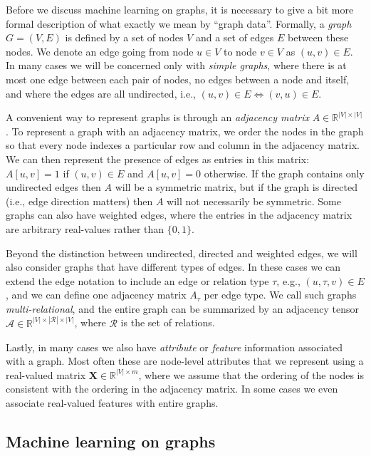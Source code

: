 \documentclass[10pt]{book}
\let\defaultmarginpar\marginpar
\renewcommand\marginpar[2][]{\defaultmarginpar{\itshape\color{gray}#2}}
\begin{document}
Before we discuss machine learning on graphs, it is necessary to give a bit more formal description of what exactly we mean by ``graph data''. Formally, a \emph{graph}\marginpar{graph} $G = (V, E)$ is defined by a set of nodes $V$ and a set of edges $E$ between these nodes. We denote an edge going from node $u \in V$ to node $v \in V$ as $(u, v) \in E$. In many cases we will be concerned only with \emph{simple graphs}, where there is at most one edge between each pair of nodes, no edges between a node and itself, and where the edges are all undirected, i.e., $(u, v) \in E \Longleftrightarrow  (v, u) \in E$.

A convenient way to represent graphs is through an \emph{adjacency matrix}\marginpar{adjacency matrix} $A \in \mathbb R^{|V| \times |V|}$. To represent a graph with an adjacency matrix, we order the nodes in the graph so that every node indexes a particular row and column in the adjacency matrix. We can then represent the presence of edges as entries in this matrix: $A[u, v] = 1$ if $(u, v) \in E$ and $A[u, v] = 0$ otherwise. If the graph contains only undirected edges then $A$ will be a symmetric matrix, but if the graph is directed (i.e., edge direction matters) then $A$ will not necessarily be symmetric. Some graphs can also have weighted edges, where the entries in the adjacency matrix are arbitrary real-values rather than $\{0, 1\}$.

Beyond the distinction between undirected, directed and weighted edges, we will also consider graphs that have different types of edges. In these cases we can extend the edge notation to include an edge or relation type $\tau$, e.g., $(u, \tau, v) \in E$, and we can define one adjacency matrix $A_\tau$ per edge type. We call such graphs \emph{multi-relational}\marginpar{multi-relational graph}, and the entire graph can be summarized by an adjacency tensor $\mathcal A \in \mathbb R^{|V| \times |\mathcal R| \times |V|}$, where $\mathcal R$ is the set of relations.

Lastly, in many cases we also have \emph{attribute} or \emph{feature} information associated with a graph. Most often these are node-level attributes that we represent using a real-valued matrix $\mathbf X \in \mathbb R^{|V| \times m}$, where we assume that the ordering of the nodes is consistent with the ordering in the adjacency matrix. In some cases we even associate real-valued features with entire graphs.

\subsection{Machine learning on graphs}
\end{document}
